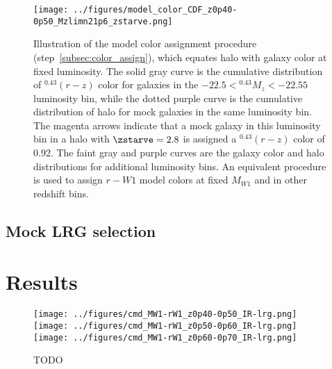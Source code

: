 \documentclass[twocolumn,apj,iop,tighten]{emulateapj2}
\begin{document}
\begin{figure}
\centering
\texttt{[image: ../figures/model\_color\_CDF\_z0p40-0p50\_Mzlimn21p6\_zstarve.png]}
\caption{Illustration of the model color assignment procedure (step~\ref{subsec:color_assign}), which equates halo \zstarve with galaxy color at fixed luminosity. The solid gray curve is the cumulative distribution of $^{0.43}(r-z)$ color for galaxies in the $-22.5 < {^{0.43}M_z} < -22.55$ luminosity bin, while the dotted purple curve is the cumulative distribution of halo \zstarve for mock galaxies in the same luminosity bin. The magenta arrows indicate that a mock galaxy in this luminosity bin in a halo with $\zstarve=2.8$ is assigned a $^{0.43}(r-z)$ color of $0.92$. The faint gray and purple curves are the galaxy color and halo \zstarve distributions for additional luminosity bins. An equivalent procedure is used to assign $r-W1$ model colors at fixed $M_{W1}$ and in other redshift bins.
}
\label{fig:color_assign}
\end{figure}


\subsection{Mock LRG selection}\label{subsec:mock_lrg}



\section{Results}\label{sec:results}

\begin{figure}
\centering
\texttt{[image: ../figures/cmd\_MW1-rW1\_z0p40-0p50\_IR-lrg.png]}
\\
\texttt{[image: ../figures/cmd\_MW1-rW1\_z0p50-0p60\_IR-lrg.png]}
\\
\texttt{[image: ../figures/cmd\_MW1-rW1\_z0p60-0p70\_IR-lrg.png]}
\caption{TODO
}
\label{fig:}
\end{figure}
\end{document}
